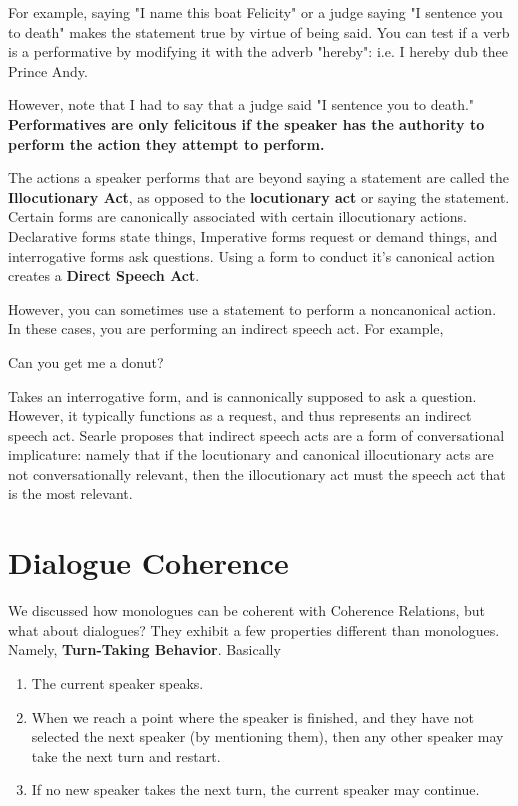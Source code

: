 \documentclass[11pt]{article}
\begin{document}
For example, saying "I name this boat Felicity" or a judge saying "I sentence you to death" makes the
statement true by virtue of being said. You can test if a verb is a performative by modifying it with
the adverb "hereby": i.e. I hereby dub thee Prince Andy. 

However, note that I had to say that a judge said "I sentence you to death." \textbf{Performatives are only
felicitous if the speaker has the authority to perform the action they attempt to perform.}

The actions a speaker performs that are beyond saying a statement are called the \textbf{Illocutionary Act},
as opposed to the \textbf{locutionary act} or saying the statement. Certain forms are canonically associated 
with certain illocutionary actions. Declarative forms state things, Imperative forms request or demand things, 
and interrogative forms ask questions. Using a form to conduct it's canonical action creates a \textbf{Direct 
Speech Act}.

However, you can sometimes use a statement to perform a noncanonical action. In these cases, you are 
performing an indirect speech act. For example,
\begin{exe}
    \ex Can you get me a donut?
\end{exe}
Takes an interrogative form, and is cannonically supposed to ask a question. However, it typically functions
as a request, and thus represents an indirect speech act. Searle proposes that indirect speech acts are a 
form of conversational implicature: namely that if the locutionary and canonical illocutionary acts are not
conversationally relevant, then the illocutionary act must the speech act that is the most relevant.

\section{Dialogue Coherence}
We discussed how monologues can be coherent with Coherence Relations, but what about dialogues? They 
exhibit a few properties different than monologues. Namely, \textbf{Turn-Taking Behavior}. Basically
\begin{enumerate}
    \item The current speaker speaks.
    \item When we reach a point where the speaker is finished, and they have not selected the next speaker
        (by mentioning them), then any other speaker may take the next turn and restart.
    \item If no new speaker takes the next turn, the current speaker may continue.
\end{enumerate}
\end{document}
